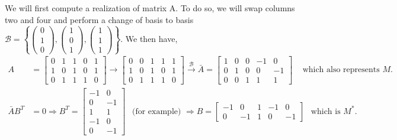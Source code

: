 We will first compute a realization of matrix A.
To do so, we will swap columns two and four and perform a change of basis to basis $\mathcal{B} = \left\lbrace \left( \begin{array}{c} 0 \\ 1 \\ 0 \end{array} \right), \left( \begin{array}{c} 1 \\ 0 \\ 1 \end{array} \right), \left( \begin{array}{c} 1 \\ 1 \\ 1 \end{array} \right) \right\rbrace$. We then have,
\begin{equation*}
    \begin{split}
        A & = \left[
            \begin{array}{ccccc}
                0 & 1 & 1 & 0 & 1 \\
                1 & 0 & 1 & 0 & 1 \\
                0 & 1 & 1 & 1 & 0
            \end{array}
        \right]
        \longrightarrow
        \left[
            \begin{array}{ccccc}
                0 & 0 & 1 & 1 & 1 \\
                1 & 0 & 1 & 0 & 1 \\
                0 & 1 & 1 & 1 & 0
            \end{array}
        \right]
        \overset{\mathcal{B}}{\longrightarrow}
        \bar{A} = \left[
            \begin{array}{ccccc}
                1 & 0 & 0 & -1 & 0 \\
                0 & 1 & 0 & 0 & -1 \\
                0 & 0 & 1 & 1 & 1
            \end{array}
        \right]
        \hspace{10pt} \text{ which also represents $M$.} \\[10pt]
        \bar{A}B^T & = 0 \Longrightarrow 
        B^T = \left[
            \begin{array}{cc}
                -1 & 0  \\
                0  & -1 \\
                1  & 1 \\
                -1 & 0 \\
                0 & -1
            \end{array}
        \right] \hspace{5pt} \text{ (for example) } \Longrightarrow
        B = \left[
            \begin{array}{ccccc}
                -1 & 0 & 1 & -1 & 0 \\
                0 & -1 & 1 & 0 & -1
            \end{array} 
        \right] \hspace{5pt} \text{ which is $M^*$.}
    \end{split}
\end{equation*}

